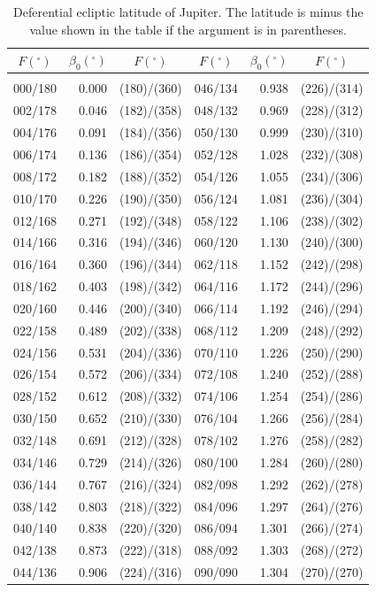 \clearpage
\begin{table}[!h]\centering
\vspace{0.25cm}
{ \begin{tabular}{crc|crc}
$F (^\circ)$ & $\beta_0(^\circ)$ & $F (^\circ)$ & $F (^\circ)$ & $\beta_0(^\circ)$ & $F (^\circ)$\\\hline
&&\\[-1.75ex]
000/180 &  0.000 & (180)/(360)&046/134 &  0.938 & (226)/(314)\\
002/178 &  0.046 & (182)/(358)&048/132 &  0.969 & (228)/(312)\\
004/176 &  0.091 & (184)/(356)&050/130 &  0.999 & (230)/(310)\\
006/174 &  0.136 & (186)/(354)&052/128 &  1.028 & (232)/(308)\\
008/172 &  0.182 & (188)/(352)&054/126 &  1.055 & (234)/(306)\\
010/170 &  0.226 & (190)/(350)&056/124 &  1.081 & (236)/(304)\\
012/168 &  0.271 & (192)/(348)&058/122 &  1.106 & (238)/(302)\\
014/166 &  0.316 & (194)/(346)&060/120 &  1.130 & (240)/(300)\\
016/164 &  0.360 & (196)/(344)&062/118 &  1.152 & (242)/(298)\\
018/162 &  0.403 & (198)/(342)&064/116 &  1.172 & (244)/(296)\\
020/160 &  0.446 & (200)/(340)&066/114 &  1.192 & (246)/(294)\\
022/158 &  0.489 & (202)/(338)&068/112 &  1.209 & (248)/(292)\\
024/156 &  0.531 & (204)/(336)&070/110 &  1.226 & (250)/(290)\\
026/154 &  0.572 & (206)/(334)&072/108 &  1.240 & (252)/(288)\\
028/152 &  0.612 & (208)/(332)&074/106 &  1.254 & (254)/(286)\\
030/150 &  0.652 & (210)/(330)&076/104 &  1.266 & (256)/(284)\\
032/148 &  0.691 & (212)/(328)&078/102 &  1.276 & (258)/(282)\\
034/146 &  0.729 & (214)/(326)&080/100 &  1.284 & (260)/(280)\\
036/144 &  0.767 & (216)/(324)&082/098 &  1.292 & (262)/(278)\\
038/142 &  0.803 & (218)/(322)&084/096 &  1.297 & (264)/(276)\\
040/140 &  0.838 & (220)/(320)&086/094 &  1.301 & (266)/(274)\\
042/138 &  0.873 & (222)/(318)&088/092 &  1.303 & (268)/(272)\\
044/136 &  0.906 & (224)/(316)&090/090 &  1.304 & (270)/(270)\\
\end{tabular}}
\caption{Deferential ecliptic latitude of Jupiter.  The latitude is minus the value shown
in the table if the argument is
in parentheses. }\label{tlat1j}
\end{table}

